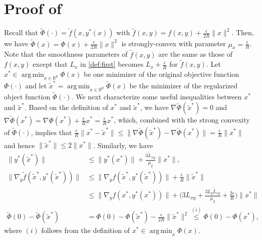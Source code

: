 \documentclass{osudissert96}
\DeclareMathOperator*{\argmin}{arg\,min}
\begin{document}

\section{Proof of }

Recall that $\widetilde \Phi(\cdot)=\widetilde f(x,y^*(x))$ with  $\widetilde f(x,y) = f(x,y) +\frac{\epsilon}{2R} \|x\|^2$. Then, we have $\widetilde\Phi(x) = \Phi(x) +\frac{\epsilon}{2R} \|x\|^2$ is strongly-convex with parameter $\mu_x=\frac{\epsilon}{R}$. Note that the smoothness parameters of $\widetilde f(x,y)$ are the same as those of $f(x,y)$ except that $L_x$ in \cref{def:first} becomes $L_x+ \frac{\epsilon}{R}$ for $\widetilde f(x,y)$. %
Let $x^*\in\argmin_{x\in\mathbb{R}^p}\Phi(x)$ be one minimizer of the original objective function $\Phi(\cdot)$ and let $\widetilde x^*=\argmin_{x\in\mathbb{R}^p}\widetilde\Phi(x)$ be the minimizer of the regularized object function $\widetilde \Phi(\cdot)$.  We next characterize some useful inequalities between $x^*$ and $\widetilde x^*$. Based on the definition of $x^*$ and $\widetilde x^*$, we have $\nabla \widetilde \Phi(\widetilde x^*) = 0$ and $\nabla\widetilde\Phi( x^*) = \nabla\Phi(x^*) + \frac{\epsilon}{R} x^* = \frac{\epsilon}{R} x^*  $, which, combined with the strong convexity of $\widetilde \Phi(\cdot)$,  implies that $\frac{\epsilon}{R}\|x^*-\widetilde x^*\|\leq\|\nabla \widetilde \Phi(\widetilde x^*) -\nabla\widetilde\Phi( x^*) \|=  \frac{\epsilon}{R} \|x^*\|$ and hence $\|\widetilde x^*\|\leq2\|x^*\|$. Similarly, we have 
\begin{align}\label{ggsmidacposcs1}
\|y^*(\widetilde x^*)\|&\leq \|y^*(x^*)\|+\frac{3\widetilde L_{xy}}{\mu_y}\|x^*\|, \nonumber
\\\|\nabla_y \widetilde f(\widetilde x^*,y^*(\widetilde x^*))\|&\leq \|\nabla_y f(\widetilde x^*,y^*(\widetilde x^*))\| + \frac{\epsilon}{R}\|\widetilde x^*\| \nonumber
\\&\leq\|\nabla_y f(x^*,y^*(x^*))\| + \Big( 3L_{xy}+\frac{3L_y\widetilde L_{xy}}{\mu_y}+\frac{2\epsilon}{R}\Big)\|x^*\|  \nonumber
\\\widetilde \Phi(0) -\widetilde \Phi(\widetilde x^*) &= \Phi(0)-\Phi(\widetilde x^*) - \frac{\epsilon}{2R}\|\widetilde x^*\|^2 \overset{(i)}\leq \Phi(0) -\Phi(x^*),
\end{align}
where $(i)$ follows from the definition of $x^*\in\argmin_x\Phi(x)$.  
\end{document}
